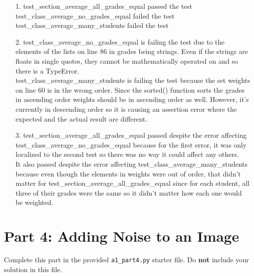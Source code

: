 \documentclass[fontsize=11pt]{article}
\begin{document}

    \begin{enumerate}
        \item[1.]
        test\_section\_average\_all\_grades\_equal passed the test \\
        test\_class\_average\_no\_grades\_equal failed the test \\
        test\_class\_average\_many\_students failed the test

        \item[2.]
        test\_class\_average\_no\_grades\_equal is failing the test due to the elements of the lists on line 86 in grades being strings. Even if the strings are floats in single quotes, they cannot be mathematically operated on and so there is a TypeError. \\
        test\_class\_average\_many\_students is failing the test because the set weights on line 60 is in the wrong order. Since the sorted() function sorts the grades in ascending order weights should be in ascending order as well. However, it's currently in descending order so it is causing an assertion error where the expected and the actual result are different.

        \item[3.]
        test\_section\_average\_all\_grades\_equal passed despite the error affecting test\_class\_average\_no\_grades\_equal because for the first error, it was only localized to the second test so there was no way it could affect any others. \\
        It also passed despite the error affecting test\_class\_average\_many\_students because even though the elements in weights were out of order, that didn't matter for test\_section\_average\_all\_grades\_equal since for each student, all three of their grades were the same so it didn't matter how each one would be weighted.
    \end{enumerate}

    \section*{Part 4: Adding Noise to an Image}

    Complete this part in the provided \texttt{a1\_part4.py} starter file.
    Do \textbf{not} include your solution in this file.
\end{document}
